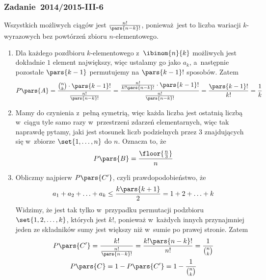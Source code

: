 \subsubsection*{Zadanie~2014/2015-III-6}
Wszystkich możliwych ciągów jest \(\frac{n!}{\pars{n - k}!}\), ponieważ jest to liczba wariacji \(k\)-wyrazowych bez powtórzeń zbioru \(n\)-elementowego.
\begin{enumerate}[label={\Alph*:}]
    \item Dla każdego pozdbioru \(k\)-elementowego z~\(\ibinom{n}{k}\) możliwych jest dokładnie \(1\) element największy, więc ustalamy go jako \(a_k\), a~następnie pozostałe \(\pars{k - 1}\) permutujemy na \(\pars{k - 1}!\) sposobów. Zatem
        \begin{equation*}
            P\pars{A}
            = \frac{\binom{n}{k} \cdot \pars{k - 1}!}{\frac{n!}{\pars{n - k}!}}
            = \frac{\frac{n!}{k!\pars{n - k}!} \cdot \pars{k - 1}!}{\frac{n!}{\pars{n - k}!}}
            = \frac{\pars{k - 1}!}{k!}
            = \frac{1}{k}
        \end{equation*}
    \item Mamy do czynienia z~pełną symetrią, więc każda liczba jest ostatnią liczbą w~ciągu tyle samo razy w~przestrzeni zdarzeń elementarnych, więc tak naprawdę pytamy, jaki jest stosunek liczb podzielnych przez \(3\) znajdujących się w~zbiorze \(\set{1, \ldots, n}\) do \(n\). Oznacza to, że
        \begin{equation*}
            P\pars{B}
            = \frac{\floor{\frac{n}{3}}}{n}
        \end{equation*}
    \item Obliczmy najpierw \(P\pars{C'}\), czyli prawdopodobieństwo, że
        \begin{equation*}
            a_1 + a_2 + \ldots + a_k \leq \frac{k\pars{k + 1}}{2} = 1 + 2 + \ldots + k
        \end{equation*}
        Widzimy, że jest tak tylko w~przypadku permutacji podzbioru \(\set{1, 2, \ldots, k}\), których jest \(k!\), ponieważ w~każdych innych przynajmniej jeden ze składników sumy jest większy niż w~sumie po prawej stronie. Zatem
        \begin{gather*}
            P\pars{C'}
            = \frac{k!}{\frac{n!}{\pars{n - k}!}}
            = \frac{k!\pars{n - k}!}{n!}
            = \frac{1}{\binom{n}{k}}\\
            P\pars{C}
            = 1 - P\pars{C'}
            = 1 - \frac{1}{\binom{n}{k}}
        \end{gather*}
\end{enumerate}
